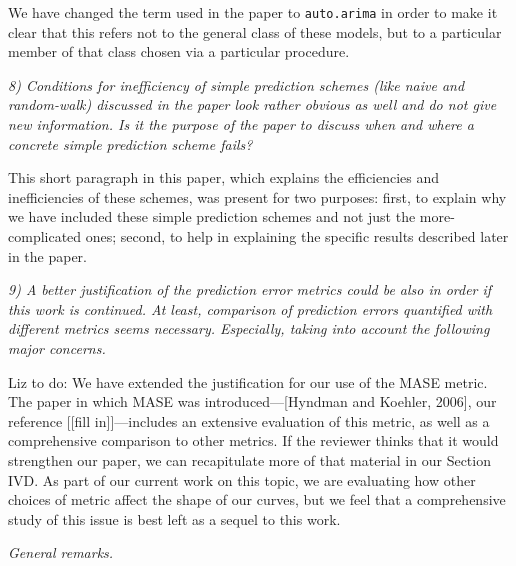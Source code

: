 \documentclass[12pt]{article}
\newcommand{\alert}[1]{{\color{red}#1}}
\begin{document}

We have changed the term used in the paper to {\tt auto.arima} in
order to make it clear that this refers not to the general class of
these models, but to a particular member of that class chosen via a
particular procedure.

\smallskip

\emph{8) Conditions for inefficiency of simple prediction schemes
  (like naive and random-walk) discussed in the paper look rather
  obvious as well and do not give new information. Is it the purpose
  of the paper to discuss when and where a concrete simple prediction
  scheme fails?}

This short paragraph in this paper, which explains the efficiencies
and inefficiencies of these schemes, was present for two purposes:
first, to explain why we have included these simple prediction schemes
and not just the more-complicated ones; second, to help in explaining
the specific results described later in the paper.

\smallskip

\emph{9) A better justification of the prediction error metrics could
  be also in order if this work is continued. At least, comparison of
  prediction errors quantified with different metrics seems
  necessary. Especially, taking into account the following major
  concerns.}

\alert{Liz to do: We have extended the justification for our use of
  the MASE metric.}  The paper in which MASE was introduced---[Hyndman
  and Koehler, 2006], our reference \alert{[[fill in]]}---includes an
extensive evaluation of this metric, as well as a comprehensive
comparison to other metrics.  If the reviewer thinks that it would
strengthen our paper, we can recapitulate more of that material in our
Section IVD. As part of our current work on this topic, we are
evaluating how other choices of metric affect the shape of our curves,
but we feel that a comprehensive study of this issue is best left as a
sequel to this work.

\smallskip

\noindent\emph{General remarks.}
\end{document}
